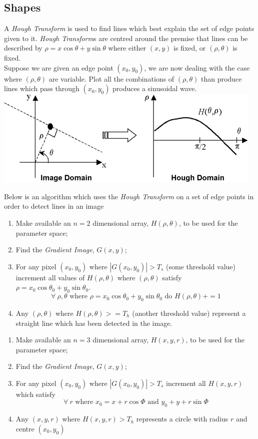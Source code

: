 \documentclass[11pt,a4paper]{article}
\begin{document}
\subsection{Shapes}

A \textit{Hough Transform} is used to find lines which best explain the set of edge points given to it. \textit{Hough Transform}s are centred around the premise that lines can be described by ${\rho=x\cos\theta+y\sin\theta}$ where either $(x,y)$ is fixed, or $(\rho,\theta)$ is fixed.\\
Suppose we are given an edge point $(x_0,y_0)$, we are now dealing with the case where $(\rho,\theta)$ are variable. Plot all the combinations of $(\rho,\theta)$ than produce lines which pass through $(x_0,y_0)$ produces a sinusoidal wave.\\
\includegraphics[scale=.7]{img/houghTransform.png}

Below is an algorithm which uses the \textit{Hough Transform} on a set of edge points in order to detect lines in an image
\begin{enumerate}[label=\roman*)]
	\item Make available an $n=2$ dimensional array, $H(\rho,\theta)$, to be used for the parameter space;
	\item Find the \textit{Gradient Image}, $G(x,y)$;
	\item For any pixel $(x_0,y_0)$ where $|G(x_0,y_0)|>T_s$ (some threshold value) increment all values of $H(\rho,\theta)$ where $(\rho,\theta)$ satisfy $\rho=x_0\cos\theta_0+y_0\sin\theta_0$.
	$$\forall\ \rho,\theta\text{ where }\rho=x_0\cos\theta_0+y_0\sin\theta_0\text{ do }H(\rho,\theta)+=1$$
	\item Any $(\rho,\theta)$ where $H(\rho,\theta)>=T_h$ (another threshold value) represent a straight line which has been detected in the image.
\end{enumerate}

\begin{enumerate}[label=\roman*)]
	\item Make available an $n=3$ dimensional array, $H(x,y,r)$, to be used for the parameter space;
	\item Find the \textit{Gradient Image}, $G(x,y)$;
	\item For any pixel $(x_0,y_0)$ where $|G(x_0,y_0)|>T_s$ increment all $H(x,y,r)$ which satisfy
	$$\forall\ r\text{ where }x_0=x+r\cos\Phi\text{ and }y_0+y+r\sin\Phi$$
	\item Any $(x,y,r)$ where $H(x,y,r)>T_h$ represents a circle with radius $r$ and centre $(x_0,y_0)$
\end{enumerate}
\end{document}
